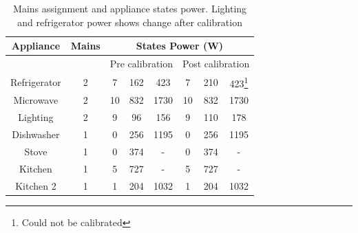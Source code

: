 \documentclass[conference]{IEEEtran}
\begin{document}

\begin{table}
\caption{Mains assignment and appliance states power. Lighting and refrigerator power shows change after calibration}
\vspace{-8pt}
\label{tab:calibration_factors}
\begin{tabular}{|c|c|c|c|c|c|c|c|}
\hline
Appliance & Mains & \multicolumn{6}{|c|}{States Power (W)}\\
\hline
&&\multicolumn{3}{|c|}{Pre calibration}&\multicolumn{3}{|c|}{Post calibration}\\
\hline
Refrigerator & 2& 7&162&423 & 7&210&423\footnote{Could not be calibrated}\\
Microwave &2& 10&832&1730& 10&832&1730\\
Lighting & 2& 9&96&156&9&110&178\\
Dishwasher & 1& 0&256& 1195 & 0&256& 1195\\
Stove& 1 & 0&374&-& 0&374&-\\
Kitchen & 1& 5&727&-&5&727&-\\
Kitchen 2&1 & 1&204&1032&1&204&1032 \\
%
%
\hline
%
\end{tabular}
\end{table}
\end{document}
